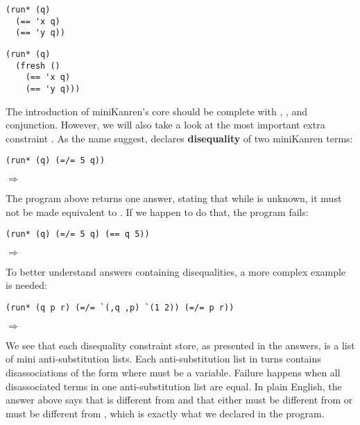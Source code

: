 \begin{lstlisting}
(run* (q)
  (== 'x q)
  (== 'y q))
\end{lstlisting}

\begin{lstlisting}
(run* (q)
  (fresh ()
    (== 'x q)
    (== 'y q)))
\end{lstlisting}

The introduction of miniKanren's core should be complete with \code{==}, ,  and conjunction. However, we will also take a look at the most important extra constraint \code{=/=}. As the name suggest, \code{=/=} declares \textbf{disequality} of two miniKanren terms:
\begin{lstlisting}
(run* (q) (=/= 5 q))
\end{lstlisting}
$\Rightarrow$ 

The program above returns one answer, stating that while  is unknown, it must not be made equivalent to . If we happen to do that, the program fails:
\begin{lstlisting}
(run* (q) (=/= 5 q) (== q 5))
\end{lstlisting}
$\Rightarrow$ \code{()}

To better understand answers containing disequalities, a more complex example is needed:
\begin{lstlisting}
(run* (q p r) (=/= `(,q ,p) `(1 2)) (=/= p r))
\end{lstlisting}
$\Rightarrow$

We see that each disequality constraint store, as presented in the answers, is a list of mini anti-substitution lists. Each anti-substitution list in turns contains disassociations of the form  where  must be a variable. Failure happens when all disassociated terms in one anti-substitution list are equal. In plain English, the answer above says that  is different from  and that either  must be different from  or  must be different from , which is exactly what we declared in the program.